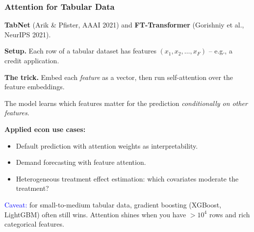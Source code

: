 \documentclass[notes,11pt, aspectratio=169]{beamer}
\begin{document}
\begin{frame}
\frametitle{Attention for Tabular Data}

\textbf{TabNet} (Arik \& Pfister, AAAI 2021) and \textbf{FT-Transformer} (Gorishniy et al., NeurIPS 2021).

\vspace{6pt}
\textbf{Setup.} Each row of a tabular dataset has features $(x_1, x_2, \ldots, x_F)$ -- e.g., a credit application.

\vspace{6pt}
\textbf{The trick.} Embed each \emph{feature} as a vector, then run self-attention over the feature embeddings.

\vspace{4pt}
The model learns which features matter for the prediction \emph{conditionally on other features}.

\vspace{8pt}
\textbf{Applied econ use cases:}
\begin{itemize}
    \item Default prediction with attention weights as interpretability.
    \item Demand forecasting with feature attention.
    \item Heterogeneous treatment effect estimation: which covariates moderate the treatment?
\end{itemize}

\vspace{6pt}
\textcolor{blue}{Caveat:} for small-to-medium tabular data, gradient boosting (XGBoost, LightGBM) often still wins. Attention shines when you have $> 10^4$ rows and rich categorical features.
\end{frame}
\end{document}
